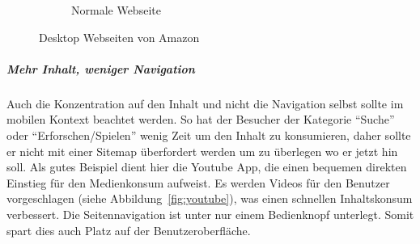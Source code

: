 \begin{figure}
\begin{subfigure}[b]{0.6\textwidth}
		\caption{Normale Webseite}\label{fig:amazonFull}
	\end{subfigure}
	\caption{Desktop Webseiten von Amazon}\label{fig:amazonSites}
\end{figure}

\subparagraph{Mehr Inhalt, weniger Navigation} 
\label{subp:entferne_das_fett} 

Auch die Konzentration auf den Inhalt und nicht die Navigation selbst sollte im mobilen Kontext beachtet werden\cite[Seite 52]{mobileFirst}. So hat der Besucher der Kategorie “Suche” oder “Erforschen/Spielen”  wenig Zeit um den Inhalt zu konsumieren, daher sollte er nicht mit einer Sitemap überfordert werden um zu überlegen wo er jetzt hin soll. Als gutes Beispiel dient hier die Youtube App, die einen bequemen direkten Einstieg für den Medienkonsum aufweist. Es werden Videos für den Benutzer vorgeschlagen (siehe Abbildung~\ref{fig:youtube}), was einen schnellen Inhaltskonsum verbessert. Die Seitennavigation ist unter nur einem Bedienknopf unterlegt. Somit spart dies auch Platz auf der Benutzeroberfläche.

